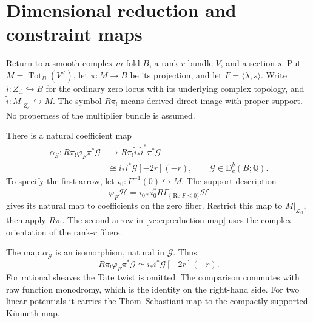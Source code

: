 \section{Dimensional reduction and constraint maps}
\label{vc:sec:reduction}

Return to a smooth complex $m$-fold $B$, a rank-$r$ bundle
$V$, and a section $s$. Put
$M=\operatorname{Tot}_B(V^\vee)$, let $\pi:M\to B$ be
its projection, and let $F=\langle\lambda,s\rangle$.
Write $i:Z_{\mathrm{cl}}\hookrightarrow B$ for the ordinary
zero locus with its underlying complex topology, and
$\widetilde i:M|_{Z_{\mathrm{cl}}}\hookrightarrow M$.
The symbol $R\pi_!$ means derived direct image with proper
support. No properness of the multiplier bundle is assumed.

There is a natural coefficient map
\begin{equation}\label{vc:eq:reduction-map}
\begin{aligned}
 \alpha_{\mathcal G}:R\pi_!\varphi_F\pi^*\mathcal G
 &\longrightarrow
 R\pi_!\widetilde i_*\widetilde i^*\pi^*\mathcal G\\
 &\cong i_*i^*\mathcal G[-2r](-r),
 \qquad \mathcal G\in\mathrm D_c^b(B;\mathbb Q).
\end{aligned}
\end{equation}
To specify the first arrow, let $i_0:F^{-1}(0)\hookrightarrow M$.
The support description
\[
 \varphi_F\mathcal H
 =i_{0*}i_0^*R\Gamma_{\{\operatorname{Re}F\leq0\}}\mathcal H
\]
gives its natural map to coefficients on the zero fiber.
Restrict this map to $M|_{Z_{\mathrm{cl}}}$, then apply
$R\pi_!$. The second arrow in \eqref{vc:eq:reduction-map}
uses the complex orientation of the rank-$r$ fibers.

\begin{theorem}\label{vc:prop:linear-reduction}
The map $\alpha_{\mathcal G}$ is an isomorphism, natural in
$\mathcal G$. Thus
\begin{equation}\label{vc:vic:eq:dimensional-reduction}
 R\pi_!\varphi_F\pi^*\mathcal G
 \simeq i_*i^*\mathcal G[-2r](-r).
\end{equation}
For rational sheaves the Tate twist is omitted.
The comparison commutes with raw function monodromy,
which is the identity on the right-hand side.
For two linear potentials it carries the Thom--Sebastiani
map to the compactly supported K\"unneth map.
\end{theorem}

